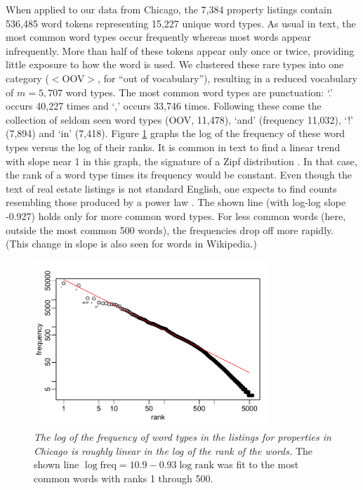 \documentclass[12pt]{article}
\begin{document}
  
 When applied to our data from Chicago, the 7,384 property listings contain
 536,485 word tokens representing 15,227 unique word types.  As usual in text,
 the most common word types occur frequently whereas most words appear
 infrequently.  More than half of these tokens appear only once or twice,
 providing little exposure to how the word is used.  We clustered these rare
 types into one category ($<$OOV$>$, for ``out of vocabulary''), resulting in a
 reduced vocabulary of $m = 5,707$ word types.  The most common word types are
 punctuation: `.'  occurs 40,227 times and `,' occurs 33,746 times.  Following
 these come the collection of seldom seen word types (OOV, 11,478), `and'
 (frequency 11,032), `!' (7,894) and `in' (7,418).  Figure \ref{fig:zipf} graphs
 the log of the frequency of these word types versus the log of their ranks.  It
 is common in text to find a linear trend with slope near 1 in this graph, the
 signature of a Zipf distribution \citep{zipf35, baayen02}.  In that case, the
 rank of a word type times its frequency would be constant.  Even though the
 text of real estate listings is not standard English, one expects to find
 counts resembling those produced by a power law \citep{clauset09}.  The shown
 line (with log-log slope -0.927) holds only for more common word types.  For
 less common words (here, outside the most common 500 words), the frequencies
 drop off more rapidly.  (This change in slope is also seen for words in
 Wikipedia.)


 \begin{figure}
 \caption{ \label{fig:zipf} { \sl The log of the frequency of word types in the
 listings for properties in Chicago is roughly linear in the log of the rank of
 the words.}  The shown line $\log \mbox{freq} = 10.9 - 0.93 \log \mbox{rank}$ 
 was fit to the most common words with ranks 1 through 500.  }

 \centerline{
 \vspace{0.1in}
 \includegraphics[width=3.5in]{figures/zipf} }
 \vspace{0.2in}
 \end{figure}
\end{document}

